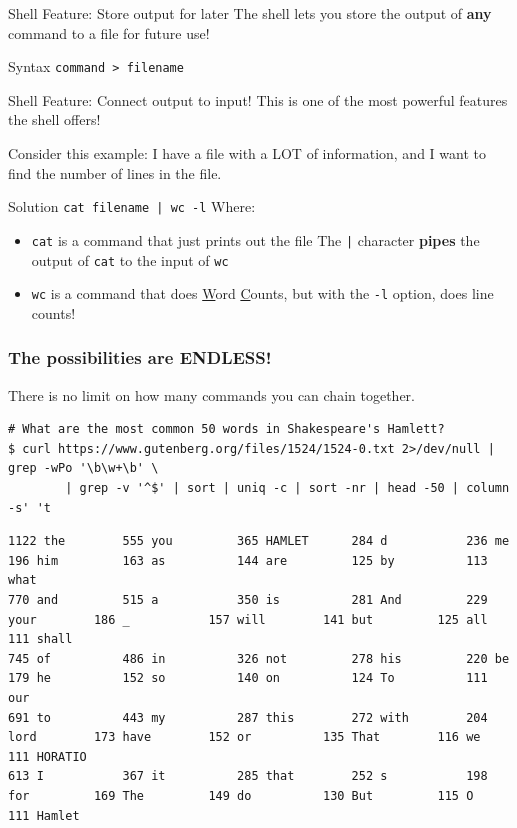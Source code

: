 \documentclass{beamer}
\begin{document}
\begin{frame}{Shell Feature: Store output for later}
	The shell lets you store the output of \textbf{any} command to a file
	for future use!

	\begin{block}{Syntax}
		\texttt{command > filename}
	\end{block}
\end{frame}

\begin{frame}{Shell Feature: Connect output to input!}
	This is one of the most powerful features the shell offers!

	Consider this example: I have a file with a LOT of information, and I
	want to find the number of lines in the file.
	
	\pause

	\begin{block}{Solution}
		\texttt{cat filename | wc -l} Where:
		\begin{itemize}
			\item \texttt{cat} is a command that just prints out
				the file The \texttt{|} character
				\textbf{pipes} the output of \texttt{cat} to
				the input of \texttt{wc}
			\item \texttt{wc} is a command that does
				\underline{W}ord \underline{C}ounts, but with
				the \texttt{-l} option, does line counts!
		\end{itemize}
	\end{block}
\end{frame}

\begin{frame}[fragile]
	\frametitle{The possibilities are ENDLESS!}
	There is no limit on how many commands you can chain together.

	\pause
{
		\tiny
	\begin{verbatim}
# What are the most common 50 words in Shakespeare's Hamlett?
$ curl https://www.gutenberg.org/files/1524/1524-0.txt 2>/dev/null | grep -wPo '\b\w+\b' \
		| grep -v '^$' | sort | uniq -c | sort -nr | head -50 | column -s' 't
	\end{verbatim}
	\begin{verbatim}
1122 the        555 you         365 HAMLET      284 d           236 me          196 him         163 as          144 are         125 by          113 what
770 and         515 a           350 is          281 And         229 your        186 _           157 will        141 but         125 all         111 shall
745 of          486 in          326 not         278 his         220 be          179 he          152 so          140 on          124 To          111 our
691 to          443 my          287 this        272 with        204 lord        173 have        152 or          135 That        116 we          111 HORATIO
613 I           367 it          285 that        252 s           198 for         169 The         149 do          130 But         115 O           111 Hamlet
	\end{verbatim}
}
\end{frame}
\end{document}
